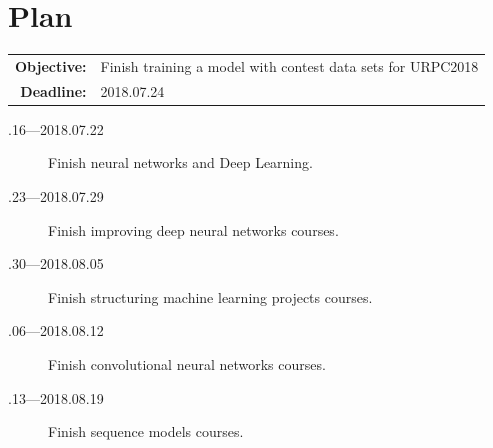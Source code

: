 \documentclass[a4paper]{article}
\begin{document}
\section{Plan}

\begin{tabular}{rl}
	\textbf{Objective:} & Finish training a model with contest data sets for URPC2018 \\
	\textbf{Deadline:} & 2018.07.24
\end{tabular}

\begin{description}
	\item[.16---2018.07.22] Finish neural networks and Deep Learning.
	\item[.23---2018.07.29] Finish improving deep neural networks courses.
	\item[.30---2018.08.05] Finish structuring machine learning projects courses.
	\item[.06---2018.08.12] Finish convolutional neural networks courses.
	\item[.13---2018.08.19] Finish sequence models courses.
\end{description}





\end{document}
